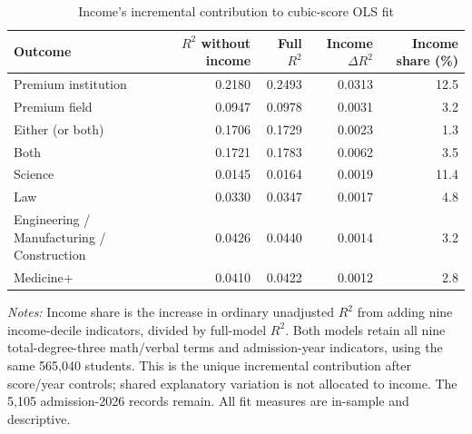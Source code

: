\begin{table}[!htbp]\centering
\caption{Income's incremental contribution to cubic-score OLS fit}
\label{tab:premium-cubic-income-contribution}
\small
\begin{tabular}{lrrrr}\hline\hline
Outcome & $R^2$ without income & Full $R^2$ & Income $\Delta R^2$ & Income share (\%) \\ \hline
Premium institution & 0.2180 & 0.2493 & 0.0313 & 12.5 \\
Premium field & 0.0947 & 0.0978 & 0.0031 & 3.2 \\
Either (or both) & 0.1706 & 0.1729 & 0.0023 & 1.3 \\
Both & 0.1721 & 0.1783 & 0.0062 & 3.5 \\
Science & 0.0145 & 0.0164 & 0.0019 & 11.4 \\
Law & 0.0330 & 0.0347 & 0.0017 & 4.8 \\
Engineering / Manufacturing / Construction & 0.0426 & 0.0440 & 0.0014 & 3.2 \\
Medicine+ & 0.0410 & 0.0422 & 0.0012 & 2.8 \\
\hline\hline\end{tabular}
\begin{minipage}{0.98\textwidth}\footnotesize
\textit{Notes:} Income share is the increase in ordinary unadjusted $R^2$ from adding nine income-decile indicators, divided by full-model $R^2$. Both models retain all nine total-degree-three math/verbal terms and admission-year indicators, using the same 565,040 students. This is the unique incremental contribution after score/year controls; shared explanatory variation is not allocated to income. The 5,105 admission-2026 records remain. All fit measures are in-sample and descriptive.
\end{minipage}
\end{table}
